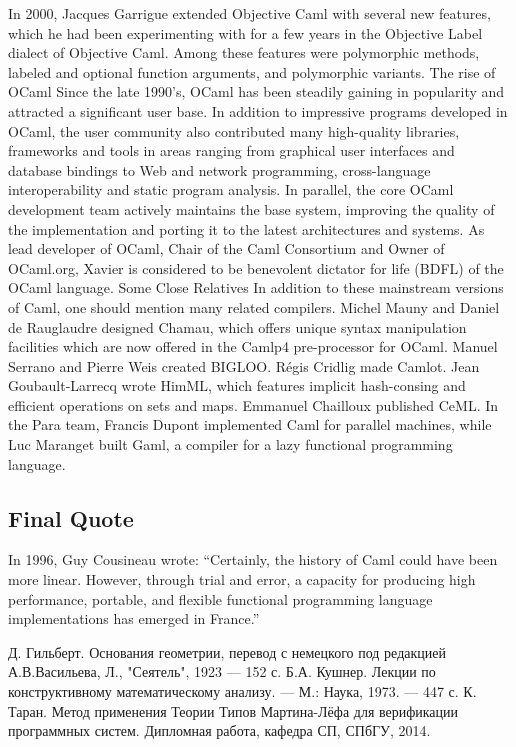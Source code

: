 \documentclass[14pt]{matmex-diploma-custom}
\begin{document}
\begin{itemize}
\begin{itemize}
In 2000, Jacques Garrigue extended Objective Caml with several new features, which he had been experimenting with for a few years in the Objective Label dialect of Objective Caml. Among these features were polymorphic methods, labeled and optional function arguments, and polymorphic variants.
The rise of OCaml
Since the late 1990's, OCaml has been steadily gaining in popularity and attracted a significant user base. In addition to impressive programs developed in OCaml, the user community also contributed many high-quality libraries, frameworks and tools in areas ranging from graphical user interfaces and database bindings to Web and network programming, cross-language interoperability and static program analysis. In parallel, the core OCaml development team actively maintains the base system, improving the quality of the implementation and porting it to the latest architectures and systems. As lead developer of OCaml, Chair of the Caml Consortium and Owner of OCaml.org, Xavier is considered to be benevolent dictator for life (BDFL) of the OCaml language.
Some Close Relatives
In addition to these mainstream versions of Caml, one should mention many related compilers. Michel Mauny and Daniel de Rauglaudre designed Chamau, which offers unique syntax manipulation facilities which are now offered in the Camlp4 pre-processor for OCaml.
Manuel Serrano and Pierre Weis created BIGLOO. Régis Cridlig made Camlot. Jean Goubault-Larrecq wrote HimML, which features implicit hash-consing and efficient operations on sets and maps. Emmanuel Chailloux published CeML. In the Para team, Francis Dupont implemented Caml for parallel machines, while Luc Maranget built Gaml, a compiler for a lazy functional programming language.
\subsection{Final Quote}
In 1996, Guy Cousineau wrote: “Certainly, the history of Caml could have been more linear. However, through trial and error, a capacity for producing high performance, portable, and flexible functional programming language implementations has emerged in France.”

\newpage
\begin{thebibliography}{9}
    Д. Гильберт. Основания геометрии, перевод с немецкого под редакцией А.В.Васильева,
    Л., "Сеятель", 1923 — 152 с.
    Б.А. Кушнер. Лекции по конструктивному математическому анализу. — М.: Наука, 1973. — 447 с.
    К. Таран. Метод применения Теории Типов Мартина-Лёфа для верификации программных систем.
    Дипломная работа, кафедра СП, СПбГУ, 2014.
  

\end{thebibliography}
\end{itemize}
\end{itemize}
\end{document}
